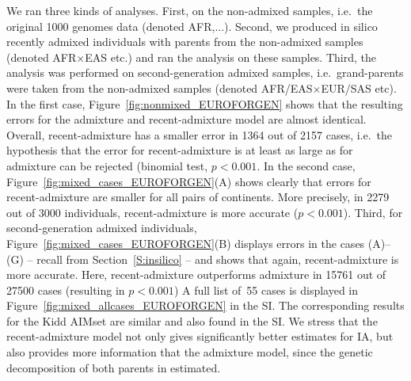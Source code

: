 \documentclass[12pt]{article}
\theoremstyle{definition}
\begin{document}
We ran three kinds of analyses. First, on the non-admixed samples,
i.e.\ the original 1000 genomes data (denoted AFR,...). Second, we
produced in silico recently admixed individuals with parents from the
non-admixed samples (denoted AFR$\times$EAS etc.) and ran the analysis
on these samples. Third, the analysis was performed on
second-generation admixed samples, i.e.\ grand-parents were taken from
the non-admixed samples (denoted AFR/EAS$\times$EUR/SAS etc). In the
first case, Figure~\ref{fig:nonmixed_EUROFORGEN} shows that the
resulting errors for the admixture and recent-admixture model are
almost identical. Overall, recent-admixture has a smaller error in
1364 out of 2157 cases, i.e.\ the hypothesis that the error for
recent-admixture is at least as large as for admixture can be rejected
(binomial test, $p<0.001$. %
In the second case, Figure~\ref{fig:mixed_cases_EUROFORGEN}(A) shows
clearly that errors for recent-admixture are smaller for all pairs of
continents. More precisely, in 2279 out of 3000 individuals,
recent-admixture is more accurate ($p<0.001$). %
Third, for second-generation admixed individuals,
Figure~\ref{fig:mixed_cases_EUROFORGEN}(B) displays errors in the
cases (A)--(G) -- recall from Section~\ref{S:insilico} -- and shows
that again, recent-admixture is more accurate. Here, recent-admixture
outperforms admixture in 15761 out of 27500 cases (resulting in
$p<0.001$) %
A full list of~55 cases is displayed in
Figure~\ref{fig:mixed_allcases_EUROFORGEN} in the SI. The
corresponding results for the Kidd AIMset are similar and also found
in the SI. We stress that the recent-admixture model not only gives
significantly better estimates for IA, but also provides more
information that the admixture model, since the genetic decomposition
of both parents in estimated.
\end{document}
